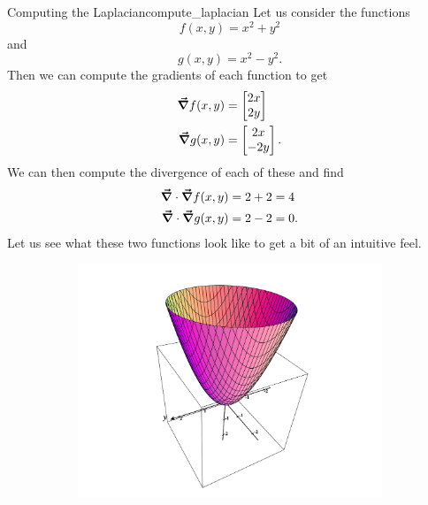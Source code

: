                \begin{ex}{Computing the Laplacian}{compute_laplacian}
               Let us consider the functions
               \[
               f(x,y) = x^2+y^2
               \]
               and
               \[
               g(x,y) = x^2-y^2.
               \]
               Then we can compute the gradients of each function to get
               \begin{align*}
                   \boldsymbol{\vec{\nabla}} f(x,y) &= \begin{bmatrix} 2x \\ 2y \end{bmatrix}\\
                   \boldsymbol{\vec{\nabla}} g(x,y) &= \begin{bmatrix} 2x \\ -2y \end{bmatrix}.
               \end{align*}
               We can then compute the divergence of each of these and find
               \begin{align*}
                   \boldsymbol{\vec{\nabla}} \cdot \boldsymbol{\vec{\nabla}} f(x,y) &= 2+2 = 4\\
                   \boldsymbol{\vec{\nabla}} \cdot \boldsymbol{\vec{\nabla}} g(x,y) &= 2-2 =0.
               \end{align*}
               Let us see what these two functions look like to get a bit of an intuitive feel.
               \begin{figure}[H]
                   \centering
                   \begin{subfigure}[h]{.45\textwidth}
                   \includegraphics[width=\textwidth]{Figures_Part_6/pos_laplace.png}

\end{subfigure}
\end{figure}
\end{ex}
